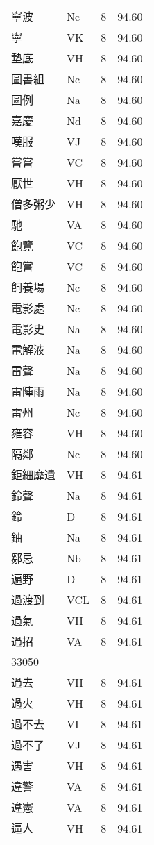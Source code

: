 \documentclass[twocolumn]{book}
\begin{document}
\begin{supertabular}{llrr}
寧波 & Nc & 8 &  94.60\\
寧 & VK & 8 &  94.60\\
墊底 & VH & 8 &  94.60\\
圖書組 & Nc & 8 &  94.60\\
圖例 & Na & 8 &  94.60\\
嘉慶 & Nd & 8 &  94.60\\
嘆服 & VJ & 8 &  94.60\\
嘗嘗 & VC & 8 &  94.60\\
厭世 & VH & 8 &  94.60\\
僧多粥少 & VH & 8 &  94.60\\
馳 & VA & 8 &  94.60\\
飽覽 & VC & 8 &  94.60\\
飽嘗 & VC & 8 &  94.60\\
飼養場 & Nc & 8 &  94.60\\
電影處 & Nc & 8 &  94.60\\
電影史 & Na & 8 &  94.60\\
電解液 & Na & 8 &  94.60\\
雷聲 & Na & 8 &  94.60\\
雷陣雨 & Na & 8 &  94.60\\
雷州 & Nc & 8 &  94.60\\
雍容 & VH & 8 &  94.60\\
隔鄰 & Nc & 8 &  94.60\\
鉅細靡遺 & VH & 8 &  94.61\\
鈴聲 & Na & 8 &  94.61\\
鈴 & D & 8 &  94.61\\
鈾 & Na & 8 &  94.61\\
鄒忌 & Nb & 8 &  94.61\\
遍野 & D & 8 &  94.61\\
過渡到 & VCL & 8 &  94.61\\
過氣 & VH & 8 &  94.61\\
過招 & VA & 8 &  94.61\\
33050\\
過去 & VH & 8 &  94.61\\
過火 & VH & 8 &  94.61\\
過不去 & VI & 8 &  94.61\\
過不了 & VJ & 8 &  94.61\\
遇害 & VH & 8 &  94.61\\
違警 & VA & 8 &  94.61\\
違憲 & VA & 8 &  94.61\\
逼人 & VH & 8 &  94.61\\

\end{supertabular}
\end{document}
